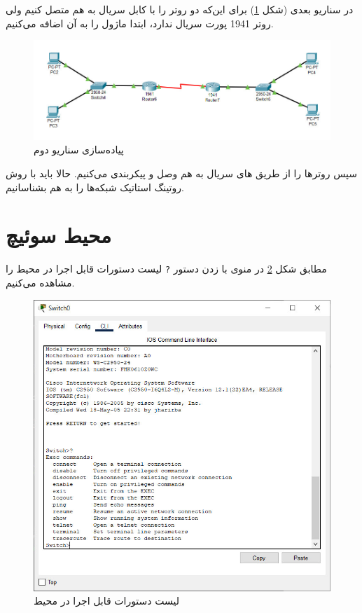 \documentclass{article}
\newcommand{\code}[1]{\colorbox{codegray}{\texttt{#1}}}
\begin{document}
در سناریو بعدی (شکل \ref{fig:scenario-2}) برای این‌که دو روتر را با کابل سریال به هم متصل کنیم ولی روتر 1941 پورت سریال ندارد، ابتدا ماژول  را به آن اضافه می‌کنیم.
\begin{figure}[h!]
	\centering
	\includegraphics[width=0.6\columnwidth]{figs/scenario-2.jpg}
	\caption{پیاده‌سازی سناریو دوم}
	\label{fig:scenario-2}
\end{figure}

سپس روترها را از طریق های سریال به هم وصل و پیکربندی می‌کنیم. 
حالا باید با روش روتینگ استاتیک شبکه‌ها را به هم بشناسانیم.


\section{محیط  سوئیچ}

مطابق شکل \ref{fig:user-excec-commands} در منوی  با زدن دستور \code{?} لیست دستورات قابل اجرا در محیط  را مشاهده می‌کنیم.
\begin{figure}[h!]
	\centering
	\includegraphics[width=0.6\columnwidth]{figs/user-excec-commands.jpg}
	\caption{لیست دستورات قابل اجرا در محیط }
	\label{fig:user-excec-commands}
\end{figure}
\end{document}
